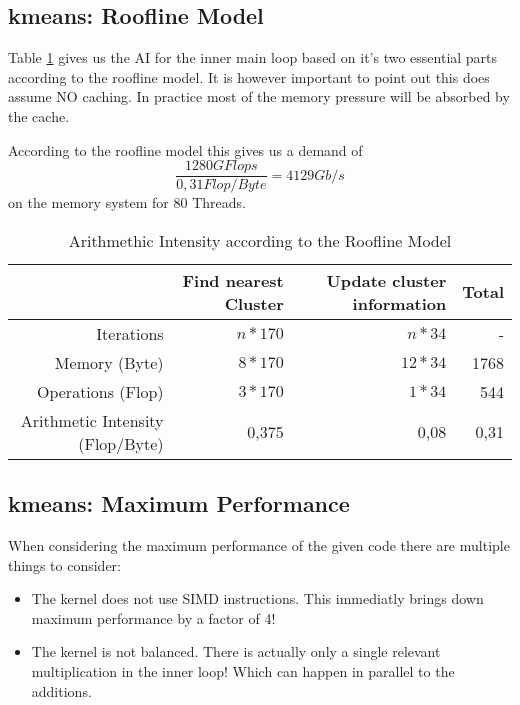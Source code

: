 \documentclass[]{article}
\begin{document}
\subsection{kmeans: Roofline Model}

Table \ref{tab:AI} gives us the AI for the inner main loop based on it's two essential parts according to the roofline model.
It is however important to point out this does assume NO caching. In practice most of the memory pressure will be absorbed by the cache.

According to the roofline model this gives us a demand of $$\frac{1280GFlops}{0,31Flop/Byte} = 4129 Gb/s$$ on the memory system for 80 Threads.

\begin{table}[ht]
	\centering
	\caption{Arithmethic Intensity according to the Roofline Model}
	\label{tab:AI}
	\begin{tabular}{|r|r|r|r|}
		\hline
		& Find nearest Cluster & Update cluster information & Total \\ \hline
		Iterations           & $n * 170$            & $n*34$                     & -     \\ \hline
		Memory (Byte)              & $8*170$              & $12*34$                      & 1768  \\ \hline
		Operations (Flop)          & $3*170$              & $1*34$                       & 544   \\ \hline
		Arithmetic Intensity (Flop/Byte) & 0,375                & 0,08                       & 0,31  \\ \hline
	\end{tabular}
\end{table}

\subsection{kmeans: Maximum Performance}

When considering the maximum performance of the given code there are multiple things to consider:

\begin{itemize}
	\item The kernel does not use SIMD instructions. This immediatly brings down maximum performance by a factor of 4!
	\item The kernel is not balanced. There is actually only a single relevant multiplication in the inner loop! Which can happen in parallel to the additions.
\end{itemize}
\end{document}
